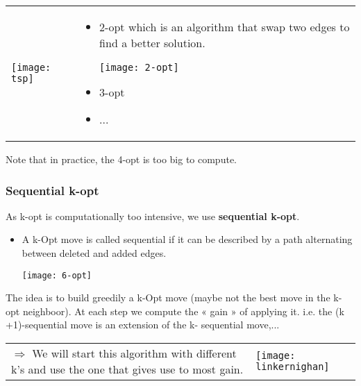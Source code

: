 \begin{tabular}{m{3.5cm}m{11cm}}
    \texttt{[image: tsp]}
    &
\begin{itemize}
    \item 2-opt which is an algorithm that swap two edges
        to find a better solution.
        \begin{center}
    \texttt{[image: 2-opt]}
        \end{center}
    \item 3-opt
    \item ...
    \end{itemize}
\end{tabular}
    Note that in practice, the 4-opt is too big to 
    compute.

\subsubsection{Sequential k-opt}

As k-opt is computationally too intensive, we
use \textbf{sequential k-opt}.

\begin{itemize}
    \item A k-Opt move is called sequential if it can be described
        by a path alternating between deleted and added
        edges.
        \begin{center}
    \texttt{[image: 6-opt]}
        \end{center}

\end{itemize}

The idea is to build greedily a k-Opt move (maybe not the best
move in the k-opt neighboor). At each
step we compute the « gain » of applying it. i.e. the (k
+1)-sequential move is an extension of the k-
sequential move,...

\begin{tabular}{m{10cm}m{6cm}}
$\Rightarrow$ We will start this algorithm with different k's and use the one that gives use to most gain.
&
\texttt{[image: linkernighan]}
\end{tabular}

